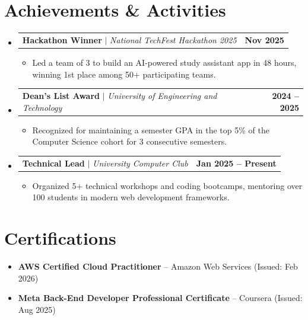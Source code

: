 \documentclass[11pt,a4paper]{article}
\newcommand{\resumeItem}[1]{
  \item \small \RaggedRight #1
}
\newcommand{\resumeProjectHeading}[2]{
  \vspace{-2pt}\item
    \begin{tabularx}{\linewidth}{X r}
      #1 & \textbf{\small #2} \\
    \end{tabularx}\vspace{-7pt}
}
\newcommand{\resumeSubHeadingListStart}{\begin{itemize}[leftmargin=0.0in, label={}]}
\newcommand{\resumeSubHeadingListEnd}{\end{itemize}\vspace{-4pt}}
\newcommand{\resumeItemListStart}{\begin{itemize}[leftmargin=0.15in, rightmargin=0in]}
\newcommand{\resumeItemListEnd}{\end{itemize}\vspace{-4pt}}
\begin{document}
\section*{Achievements \& Activities}
\resumeSubHeadingListStart
  \resumeProjectHeading
    {\textbf{Hackathon Winner} $|$ \emph{National TechFest Hackathon 2025}}{Nov 2025}
    \resumeItemListStart
      \resumeItem{Led a team of 3 to build an AI-powered study assistant app in 48 hours, winning 1st place among 50+ participating teams.}
    \resumeItemListEnd
  \resumeProjectHeading
    {\textbf{Dean's List Award} $|$ \emph{University of Engineering and Technology}}{2024 -- 2025}
    \resumeItemListStart
      \resumeItem{Recognized for maintaining a semester GPA in the top 5\% of the Computer Science cohort for 3 consecutive semesters.}
    \resumeItemListEnd
  \resumeProjectHeading
    {\textbf{Technical Lead} $|$ \emph{University Computer Club}}{Jan 2025 -- Present}
    \resumeItemListStart
      \resumeItem{Organized 5+ technical workshops and coding bootcamps, mentoring over 100 students in modern web development frameworks.}
    \resumeItemListEnd
\resumeSubHeadingListEnd

\section*{Certifications}
\begin{itemize}[leftmargin=0.15in, itemsep=1pt]
  \small
  \item \textbf{AWS Certified Cloud Practitioner} -- Amazon Web Services (Issued: Feb 2026)
  \item \textbf{Meta Back-End Developer Professional Certificate} -- Coursera (Issued: Aug 2025)
\end{itemize}
\end{document}
